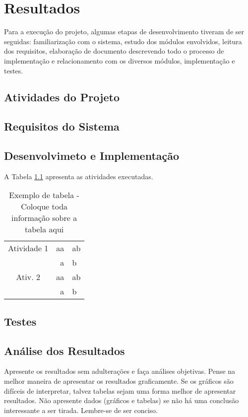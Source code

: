 \chapter{Resultados}
\label{chap:resultados}
Para a execução do projeto, algumas etapas de desenvolvimento tiveram de ser seguidas: familiarização com o sistema, estudo dos módulos envolvidos, leitura dos requisitos, elaboração de documento descrevendo todo o processo de implementação e relacionamento com os diversos módulos, implementação e testes.


\section{Atividades do Projeto}
\label{metodo3}

\section {Requisitos do Sistema}
\label{req}


\section{Desenvolvimeto e Implementação}

A Tabela \ref{tab:tabela} apresenta as atividades executadas.

\begin{table}
\centering
\begin{tabular}{|c|r|l|}\hline
		Atividade 1 & aa  & ab  \\ 
					 & a & b \\ \hline
		Ativ. 2  & aa & ab \\			
					 &  a & b \\ \hline
		\end{tabular}
	\caption{Exemplo de tabela - Coloque toda informação sobre a tabela aqui}
	\label{tab:tabela}
\end{table}

\section{Testes}

\section{Análise dos Resultados}

Apresente os resultados sem adulterações e faça análises objetivas. Pense na melhor maneira de apresentar os resultados graficamente. Se os gráficos são difíceis de interpretar, talvez tabelas sejam uma forma melhor de apresentar resultados. Não apresente dados (gráficos e tabelas) se não há uma conclusão interessante a ser tirada. Lembre-se de ser conciso.

